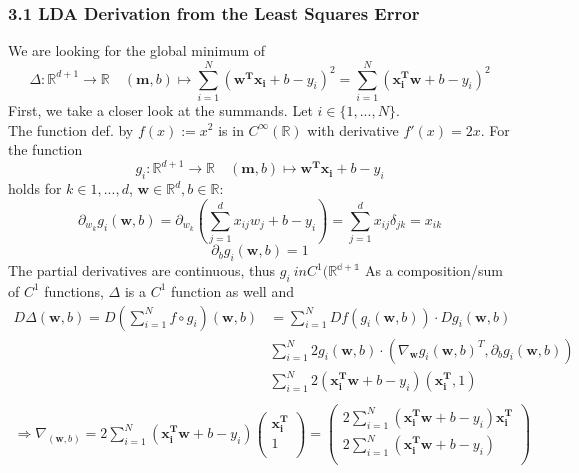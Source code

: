 \documentclass[11pt]{article}
\title{\flushleft{\textbf{Problem Sheet I}}}
\date{}
\begin{document}
\maketitle
\thispagestyle{fancy}

\subsubsection{3.1 LDA Derivation from the Least Squares Error}
We are looking for the global minimum of
\begin{equation}
\Delta: \mathbb{R}^{d+1} \rightarrow \mathbb{R} \quad (\mathbf{m},b) \mapsto \sum_{i=1}^N (\mathbf{w^T x_i} + b - y_i)^2 = \sum_{i=1}^N (\mathbf{x_i^T w} + b - y_i)^2 
\end{equation}
First, we take a closer look at the summands. Let $i \in \{1,...,N\}$.\\
The function def. by $f(x):=x^2$ is in $C^\infty(\mathbb{R})$ with derivative $f'(x) = 2x$. For the function
\begin{equation}
g_i: \mathbb{R}^{d+1} \rightarrow \mathbb{R} \quad (\mathbf{m},b) \mapsto \mathbf{w^T x_i} + b - y_i
\end{equation}
holds for $k \in {1,...,d}$, $\mathbf{w} \in \mathbb{R}^d, b \in \mathbb{R}$:
\begin{equation}
\partial_{w_k} g_i(\mathbf{w}, b) = \partial_{w_k} \left( \sum_{j=1}^d x_{ij} w_j + b - y_i \right) = \sum_{j=1}^d x_{ij} \delta_{jk} = x_{ik}
\end{equation}
\begin{equation}
\partial_b g_i(\mathbf{w}, b) = 1
\end{equation}
The partial derivatives are continuous, thus $g_i \ in C^1(\mathbb{R^{d+1}}$
As a composition/sum of $C^1$ functions, $\Delta$ is a $C^1$ function as well and 
\begin{align*}
D\Delta(\mathbf{w},b) = D\left(\sum_{i=1}^N f \circ g_i \right)(\mathbf{w},b) & = \sum_{i=1}^N Df(g_i(\mathbf{w}, b)) \cdot Dg_i(\mathbf{w}, b) \\
& \sum_{i=1}^N 2g_i(\mathbf{w}, b) \cdot (\nabla_{\mathbf{w}} g_i(\mathbf{w}, b)^T, \partial_b g_i(\mathbf{w},b)) \\
& \sum_{i=1}^N 2(\mathbf{x_i^Tw} + b - y_i) (\mathbf{x_i^T}, 1)\\
\end{align*}
\begin{align*}
\Rightarrow \nabla_{(\mathbf{w},b)} = 2 \sum_{i=1}^N (\mathbf{x_i^T w}+b-y_i) \left(
\begin{array}{c}
\mathbf{x_i^T}\\
1\\
\end{array}
\right) = \left(
\begin{array}{c}
2 \sum_{i=1}^N (\mathbf{x_i^T w} + b - y_i)  \mathbf{x_i^T}\\
2 \sum_{i=1}^N (\mathbf{x_i^T w} + b - y_i)\\
\end{array}
\right)
\end{align*}
\end{document}
